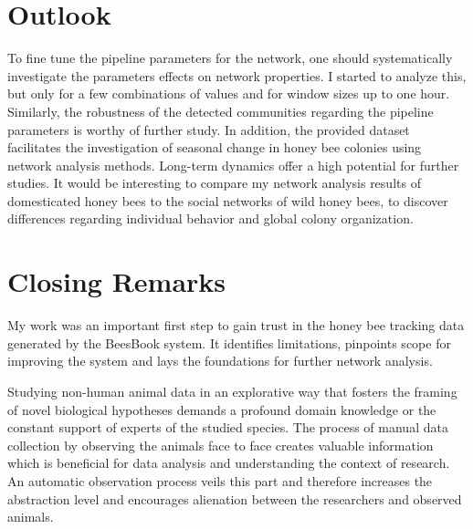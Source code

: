 \section{Outlook}
To fine tune the pipeline parameters for the network, one should systematically investigate the parameters effects on network properties.
I started to analyze this, but only for a few combinations of values and for window sizes up to one hour.
Similarly, the robustness of the detected communities regarding the pipeline parameters is worthy of further study.
In addition, the provided dataset facilitates the investigation of seasonal change in honey bee colonies using network analysis methods. Long-term dynamics offer a high potential for further studies. It would be interesting to compare my network analysis results of domesticated honey bees to the social networks of wild honey bees, to discover differences regarding individual behavior and global colony organization.

\section{Closing Remarks}

My work was an important first step to gain trust in the honey bee tracking data generated by the BeesBook system.
It identifies limitations, pinpoints scope for improving the system and lays the foundations for further network analysis.

Studying non-human animal data in an explorative way that fosters the framing of novel biological hypotheses demands a profound domain knowledge or the constant support of experts of the studied species.
The process of manual data collection by observing the animals face to face creates valuable information which is beneficial for data analysis and understanding the context of research.
An automatic observation process veils this part and therefore increases the abstraction level and encourages alienation between the researchers and observed animals.

